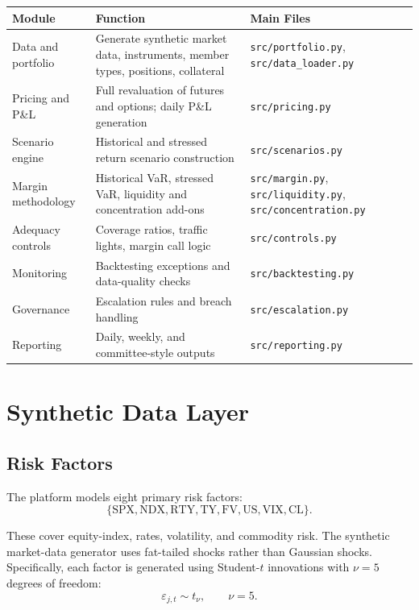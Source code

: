\documentclass[11pt]{article}
\begin{document}
\begin{center}
\begin{tabular}{>{\raggedright\arraybackslash}p{} >{\raggedright\arraybackslash}p{} >{\raggedright\arraybackslash}p{}}
\toprule
Module & Function & Main Files \\
\midrule
Data and portfolio & Generate synthetic market data, instruments, member types, positions, collateral & \texttt{src/portfolio.py}, \texttt{src/data\_loader.py} \\
Pricing and P\&L & Full revaluation of futures and options; daily P\&L generation & \texttt{src/pricing.py} \\
Scenario engine & Historical and stressed return scenario construction & \texttt{src/scenarios.py} \\
Margin methodology & Historical VaR, stressed VaR, liquidity and concentration add-ons & \texttt{src/margin.py}, \texttt{src/liquidity.py}, \texttt{src/concentration.py} \\
Adequacy controls & Coverage ratios, traffic lights, margin call logic & \texttt{src/controls.py} \\
Monitoring & Backtesting exceptions and data-quality checks & \texttt{src/backtesting.py} \\
Governance & Escalation rules and breach handling & \texttt{src/escalation.py} \\
Reporting & Daily, weekly, and committee-style outputs & \texttt{src/reporting.py} \\
\bottomrule
\end{tabular}
\end{center}

\section{Synthetic Data Layer}

\subsection{Risk Factors}

The platform models eight primary risk factors:
\[
\{\text{SPX}, \text{NDX}, \text{RTY}, \text{TY}, \text{FV}, \text{US}, \text{VIX}, \text{CL}\}.
\]

These cover equity-index, rates, volatility, and commodity risk. The synthetic market-data generator uses fat-tailed shocks rather than Gaussian shocks. Specifically, each factor is generated using Student-\(t\) innovations with \(\nu=5\) degrees of freedom:
\[
\varepsilon_{j,t} \sim t_{\nu}, \qquad \nu=5.
\]
\end{document}
